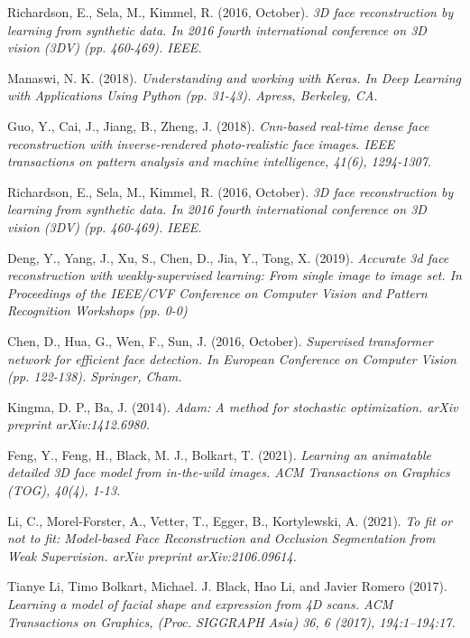 \documentclass[12pt,a4]{article}
\begin{document}
\begin{thebibliography}{9}
	
	Richardson, E., Sela, M., Kimmel, R. (2016, October). 
	\textit{3D face reconstruction by learning from synthetic data. In 2016 fourth international conference on 3D vision (3DV) (pp. 460-469). IEEE.}
	
	Manaswi, N. K. (2018).
	\textit{Understanding and working with Keras. In Deep
		Learning with Applications Using Python (pp. 31-43). Apress, Berkeley,
		CA.}
	
	Guo, Y., Cai, J., Jiang, B., Zheng, J. (2018).
	\textit{Cnn-based real-time
		dense face reconstruction with inverse-rendered photo-realistic face images. IEEE transactions on pattern analysis and machine intelligence,
		41(6), 1294-1307.}
	
	 Richardson, E., Sela, M., Kimmel, R. (2016, October).
	\textit{3D face reconstruction by learning from synthetic data. In 2016 fourth international conference on 3D vision (3DV) (pp. 460-469). IEEE.}
	
	Deng, Y., Yang, J., Xu, S., Chen, D., Jia, Y., Tong, X. (2019).
	\textit{Accurate
		3d face reconstruction with weakly-supervised learning: From single image
		to image set. In Proceedings of the IEEE/CVF Conference on Computer
		Vision and Pattern Recognition Workshops (pp. 0-0)}
	
	Chen, D., Hua, G., Wen, F., Sun, J. (2016, October). 
	\textit{Supervised transformer network for efficient face detection. In European Conference on
		Computer Vision (pp. 122-138). Springer, Cham.}
	
	Kingma, D. P., Ba, J. (2014).
	\textit{Adam: A method for stochastic optimization. arXiv preprint arXiv:1412.6980.}
	
	Feng, Y., Feng, H., Black, M. J., Bolkart, T. (2021).
	\textit{Learning an animatable detailed 3D face model from in-the-wild images. ACM Transactions
		on Graphics (TOG), 40(4), 1-13.}
	
	Li, C., Morel-Forster, A., Vetter, T., Egger, B., Kortylewski, A. (2021).
	\textit{To fit or not to fit: Model-based Face Reconstruction and Occlusion Segmentation from Weak Supervision. arXiv preprint arXiv:2106.09614.}
	
	Tianye Li, Timo Bolkart, Michael. J. Black, Hao Li, and Javier Romero
	(2017).
	\textit{Learning a model of facial shape and expression from 4D scans.
		ACM Transactions on Graphics, (Proc. SIGGRAPH Asia) 36, 6 (2017),
		194:1–194:17.}
	

\end{thebibliography}
\end{document}
